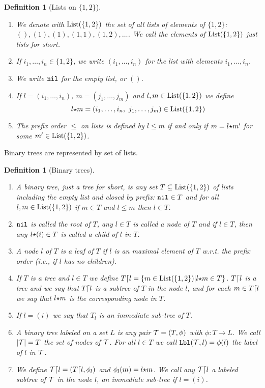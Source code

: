 \documentclass{article}
\newtheorem{definition}[theorem]{Definition}
\begin{document}
\begin{definition}[Lists on $\{1,2\}$]
\begin{enumerate}
\item
We denote with ${\rm List}(\{1,2\})$ the set of all lists of elements of $\{1,2\}$: $(),(1),(1),(1,1),(1,2),\ldots$. 
We call the elements of ${\rm List}(\{1,2\})$ just lists for short.
\item
If $i_1, \ldots, i_n \in \{1,2\}$, we write $(i_1, \ldots, i_n)$
for the list with elements $i_1, \ldots, i_n$. 
\item
We write ${\tt nil}$ for the empty list, or $()$. 
\item
If $l=(i_1, \ldots, i_n)$, $m=(j_1, \ldots, j_m)$ and $l, m \in {\rm List}(\{1,2\})$ we define
$$
l {\star} m = (i_1, \ldots, i_n,\ j_1, \ldots, j_m)\in {\rm List}(\{1,2\})
$$
\item
The prefix order $\le$ on lists
is defined by $l \le m$ if and only if $m = l {\star} m'$ for some $m' \in  {\rm List}(\{1,2\})$.
\end{enumerate}
\end{definition}

Binary trees are represented by set of lists.

\begin{definition}[Binary trees]
\begin{enumerate}
\item 
A binary tree, just a tree for short, is any set $T\subseteq {\rm List}(\{1,2\})$ 
of lists including the empty list and closed by prefix: ${\tt nil} \in T$ and for all $l, m \in {\rm List}(\{1,2\})$
if $m \in T$ and $l \le m$ then $l \in T$. 
\item
${\tt nil}$ is called the root of $T$, any $l \in T$ is called a node of
$T$ and if $l \in T$, then any $l {\star} (i) \in T$ is called a child of $l$ in $T$.
\item
A node $l$ of $T$ is a leaf of $T$ if $l$ is an maximal element of $T$ w.r.t. the prefix order (i.e.,
if $l$ has no children). 
\item
If $T$ is a tree and $l \in T$ we define $T {\lceil} l = \{m \in {\rm List}(\{1,2\}) | l {\star} m \in T\}$.
$T {\lceil} l$ is a tree and we say that $T {\lceil} l$ is a subtree of $T$ in the node $l$,
and for each $m \in T {\lceil} l$ we say that $l {\star} m$ is the corresponding node in $T$.
\item
If $l=(i)$ we say that $T_l$ is an immediate sub-tree of $T$.
\item
A binary tree labeled on a set $L$ is any pair ${\mathcal T} = (T, \phi)$ with 
$\phi:T \rightarrow L$. We call ${|{\mathcal T}|}=T$ the set of nodes of ${\mathcal T}$.
For all $l \in T$ we call ${\tt Lbl}({\mathcal T},l) = \phi(l)$ the label of $l$ in ${\mathcal T}$.
\item
We define ${\mathcal T} {\lceil} l = (T {\lceil} l, \phi_l)$ and $\phi_l(m) = l {\star} m$. 
We call any ${\mathcal T} {\lceil} l$ a labeled subtree of ${\mathcal T}$
in the node $l$, an immediate sub-tree if $l=(i)$. 
\end{enumerate}
\end{definition}
\end{document}
